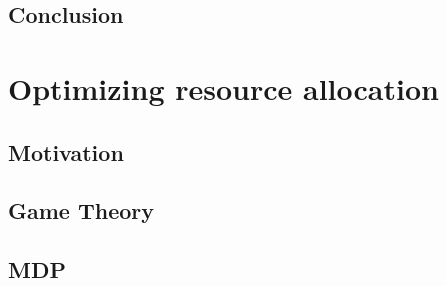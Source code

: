 \documentclass[a4paper, 11pt]{article}
\begin{document}
\newpage
\subsection{Conclusion}


\newpage
\section{Optimizing resource allocation}
\subsection{Motivation}




\newpage
\subsection{Game Theory}


\newpage
\subsection{MDP}


\newpage


\newpage
{}


\newpage
\begin{appendices}

\newpage

\end{appendices}
\end{document}
